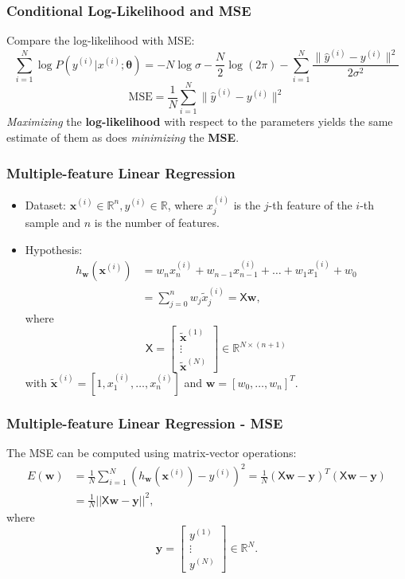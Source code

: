 \documentclass{beamer}
\begin{document}
	\begin{frame}
		\frametitle{Conditional Log-Likelihood and MSE}
		Compare the log-likelihood with MSE:
		$$\sum_{i=1}^{N}\log P(y^{(i)} | x^{(i)}; \bm{\theta}) = -N\log \sigma - \frac{N}{2}\log (2\pi) - \sum_{i=1}^{N}\frac{\|\hat{y}^{(i)}-y^{(i)}\|^2}{2\sigma^2}$$
		$$ \textrm{MSE} = \frac{1}{N}  \sum_{i=1}^{N}\|\hat{y}^{(i)}-y^{(i)}\|^2$$
		\textit{Maximizing} the \textbf{log-likelihood }with respect to the parameters yields the same estimate of them as does \textit{minimizing} the \textbf{MSE}.
		
	\end{frame}

	\begin{frame}
		\frametitle{Multiple-feature Linear Regression}
		
		\begin{itemize}
			\item Dataset: $\bm{x}^{(i)} \in \mathbb{R}^n, y^{(i)} \in \mathbb{R}$, where
			$x^{(i)}_j$ is the $j$-th feature of the $i$-th sample and $n$ is the number of features.
			\item Hypothesis: 
			\begin{align*}
				h_{\bm{w}}(\bm{x}^{(i)}) &= w_{n}x^{(i)}_n + w_{n-1}x^{(i)}_{n-1} + \dots + w_1 x^{(i)}_1 + w_0\\
				&= \sum_{j=0}^n w_j \tilde{x}^{(i)}_j = \mathsf{X}\bm{w},
			\end{align*}
			where
				\begin{equation*}
				\mathsf{X} = \begin{bmatrix}
					\tilde{\bm{x}}^{(1)}\\
					\vdots\\
					\tilde{\bm{x}}^{(N)}
				\end{bmatrix} \in \mathbb{R}^{N \times (n+1)}
			\end{equation*}
			with $\tilde{\bm{x}}^{(i)} = [1, x^{(i)}_1, \dots, x^{(i)}_n]$ and $\bm{w} = [w_0, \dots, w_n]^T$.
		\end{itemize}
		
	\end{frame}

	\begin{frame}
		\frametitle{Multiple-feature Linear Regression - MSE}
		The MSE can be computed using matrix-vector operations:
		\begin{align*}
			E(\bm{w}) &= \frac{1}{N} \sum_{i=1}^{N} (h_{\bm{w}}(\bm{x}^{(i)}) - y^{(i)})^2 = \frac{1}{N} (\mathsf{X} \bm{w} - \bm{y})^T (\mathsf{X}\bm{w} - \bm{y})\\
			&= \frac{1}{N} ||\mathsf{X}\bm{w} - \bm{y}||^2,
		\end{align*}
		where
		\begin{equation*}
			 \bm{y} = \begin{bmatrix}
			y^{(1)} \\
			\vdots\\
			y^{(N)}
		\end{bmatrix} \in \mathbb{R}^N.
		\end{equation*}
	\end{frame}
\end{document}
